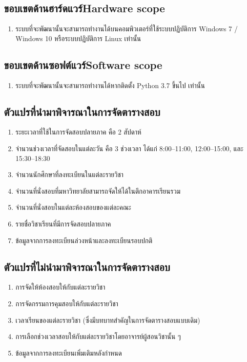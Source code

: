 \subsection{\ifcpe ขอบเขตด้านฮาร์ดแวร์\else Hardware scope\fi}
\begin{enumerate}
    \item ระบบที่จะพัฒนานั้นจะสามารถทำงานได้บนคอมพิวเตอร์ที่ใช้ระบบปฏิบัติการ Windows 7 / Windows 10 หรือระบบปฏิบัติการ Linux เท่านั้น
\end{enumerate}
\subsection{\ifcpe ขอบเขตด้านซอฟต์แวร์\else Software scope\fi}
\begin{enumerate}
    \item ระบบที่จะพัฒนานั้นจะสามารถทำงานได้หากติดตั้ง Python 3.7 ขึ้นไป เท่านั้น 
\end{enumerate}
\subsection{ตัวแปรที่นำมาพิจารณาในการจัดตารางสอบ}
\begin{enumerate}
    \item ระยะเวลาที่ใช้ในการจัดสอบปลายภาค คือ 2 สัปดาห์
    \item จำนวนช่วงเวลาที่จัดสอบในแต่ละวัน คือ 3 ช่วงเวลา ได้แก่ 8:00--11:00, 12:00--15:00, 
    และ 15:30--18:30
    \item จำนวนนักศึกษาที่ลงทะเบียนในแต่ละรายวิชา
    \item จำนวนที่นั่งสอบที่มหาวิทยาลัยสามารถจัดให้ได้ในตึกอาคารเรียนรวม
    \item จำนวนที่นั่งสอบในแต่ละห้องสอบของแต่ละคณะ
    \item รายชื่อวิชาเรียนที่มีการจัดสอบปลายภาค
    \item ข้อมูลจากการลงทะเบียนล่วงหน้าและลงทะเบียนรอบปกติ
\end{enumerate}

\subsection{ตัวแปรที่ไม่นำมาพิจารณาในการจัดตารางสอบ}
\begin{enumerate}
    \item การจัดให้ห้องสอบให้กับแต่ละรายวิชา
    \item การจัดกรรมการคุมสอบให้กับแต่ละรายวิชา
    \item เวลาเรียนของแต่ละรายวิชา (ซึ่งมีบทบาทสำคัญในการจัดตารางสอบแบบเดิม)
    \item การเลือกช่วงเวลาสอบให้กับแต่ละรายวิชาโดยอาจารย์ผู้สอนวิชานั้น ๆ
    \item ข้อมูลจากการลงทะเบียนเพิ่มเติมหลังกำหนด
\end{enumerate}

